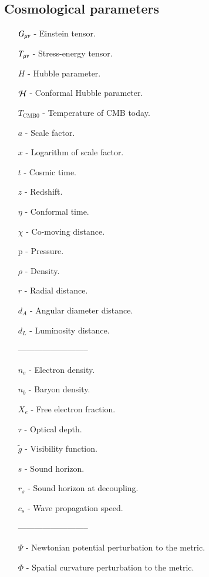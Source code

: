 \subsection*{Cosmological parameters}
\begin{itemize}
    \item[$G_{\mu\nu}$] - Einstein tensor.
    \item[$T_{\mu\nu}$] - Stress-energy tensor.
    \item[$H$] - Hubble parameter.
    \item[$\mathcal{H}$]  - Conformal Hubble parameter.
    \item[$T_{\mathrm{CMB}0}$] - Temperature of CMB today.
    \item[$a$] - Scale factor.
    \item[$x$] - Logarithm of scale factor.
    \item[$t$] - Cosmic time.
    \item[$z$] - Redshift.
    \item[$\eta$] - Conformal time.
    \item[$\chi$] - Co-moving distance. 
    \item[p] - Pressure.
    \item[$\rho$] - Density.
    \item[$r$] - Radial distance.
    \item[$d_A$] - Angular diameter distance.
    \item[$d_L$] - Luminosity distance.
    \item[] --------------------------
    \item[$n_e$] - Electron density.
    \item[$n_b$] - Baryon density. 
    \item[$X_e$] - Free electron fraction.
    \item[$\tau$] - Optical depth.
    \item[$\tilde{g}$] - Visibility function. 
    \item[$s$] - Sound horizon.
    \item[$r_s$] - Sound horizon at decoupling. 
    \item[$c_s$] - Wave propagation speed.
    \item[] --------------------------
    \item[$\Psi$] - Newtonian potential perturbation to the metric. 
    \item[$\Phi$] - Spatial curvature perturbation to the metric.

\end{itemize}
